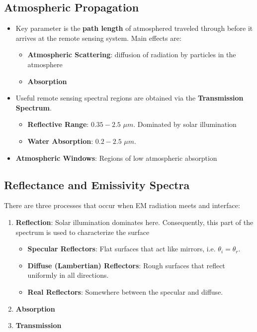\subsection{Atmospheric Propagation}

\begin{itemize}
\item Key parameter is the \textbf{path length} of atmosphered traveled through before it arrives at the remote sensing system. Main effects are:
  \begin{itemize}
  \item \textbf{Atmospheric Scattering}: diffusion of radiation by particles in the atmosphere
  \item \textbf{Absorption}
  \end{itemize}
\item Useful remote sensing spectral regions are obtained via the \textbf{Transmission Spectrum}.
  \begin{itemize}
  \item \textbf{Reflective Range}: $0.35-2.5$ $\mu m$. Dominated by solar illumination
  \item \textbf{Water Absorption}: $0.2-2.5$ $\mu m$.
  \end{itemize}
\item \textbf{Atmospheric Windows}: Regions of low atmospheric absorption
\end{itemize}

\subsection{Reflectance and Emissivity Spectra}

There are three processes that occur when EM radiation meets and interface:
\begin{enumerate}
  \item \textbf{Reflection}: Solar illumination dominates here. Consequently, this part of the spectrum is used to characterize the surface
    \begin{itemize}
    \item \textbf{Specular Reflectors}: Flat surfaces that act like mirrors, i.e. $\theta_i = \theta_r$.
    \item \textbf{Diffuse (Lambertian) Reflectors}: Rough surfaces that reflect uniformly in all directions.
    \item \textbf{Real Reflectors}: Somewhere between the specular and diffuse.
   \end{itemize}
\item \textbf{Absorption}
\item \textbf{Transmission}
\end{enumerate}

